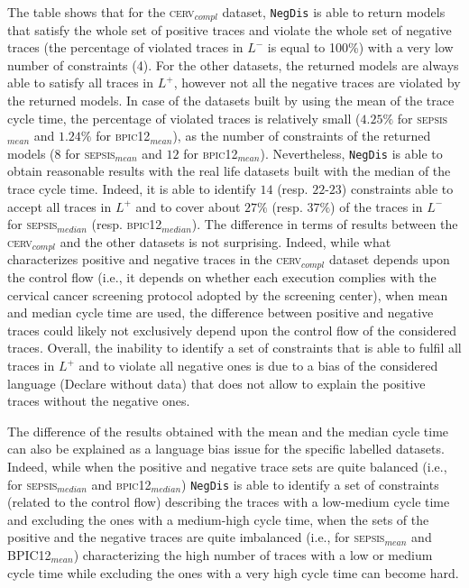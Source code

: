 \documentclass[a4wide,11pt]{article}
\theoremstyle{definition}
\theoremstyle{plain}
\newcommand{\nd}{\texttt{NegDis}\xspace}
\begin{document}
The table shows that for the \textsc{cerv$_{compl}$} dataset, \nd is able to return models that satisfy the whole set of positive traces and violate the whole set of negative traces (the percentage of violated traces in $L^-$ is equal to 100\%) with a very low number of constraints (4). For the other datasets, the returned models are always able to satisfy all traces in $L^+$, however not all the negative traces are violated by the returned models. In case of the datasets built by using the mean of the trace cycle time, the percentage of violated traces is relatively small ($4.25\%$ for \textsc{sepsis$_{mean}$} and $1.24\%$ for \textsc{bpic12$_{mean}$}), as the number of constraints of the returned models ($8$ for \textsc{sepsis$_{mean}$} and $12$ for \textsc{bpic12$_{mean}$}). Nevertheless, \nd is able to obtain reasonable results with the real life datasets built with the median of the trace cycle time. Indeed, it is able to identify $14$ (resp. $22$-$23$) constraints able to accept all traces in $L^+$ and to cover about $27\%$ (resp. $37\%$) of the traces in $L^-$ for \textsc{sepsis$_{median}$} (resp. \textsc{bpic12$_{median}$}). The difference in terms of results between the \textsc{cerv$_{compl}$} and the other datasets is not surprising. Indeed, while what characterizes positive and negative traces in the \textsc{cerv$_{compl}$} dataset depends upon the control flow (i.e., it depends on whether each execution complies with the cervical cancer screening protocol adopted by the screening center), when mean and median cycle time are used, the difference between positive and negative traces could likely not exclusively depend upon the control flow of the considered traces. Overall, the inability to identify a set of constraints that is able to fulfil all traces  in $L^+$ and to violate all negative ones is due to a bias of the considered language (Declare without data) that does not allow to explain the positive traces without the negative ones.

The difference of the results obtained with the mean and the median cycle time can also be explained as a language bias issue for the specific labelled datasets. Indeed, while when the positive and negative trace sets are quite balanced (i.e., for \textsc{sepsis$_{median}$} and \textsc{bpic12$_{median}$}) \nd is able to identify a set of constraints (related to the control flow) describing the traces with a low-medium cycle time and excluding the ones with a medium-high cycle time, when the sets of the positive and the negative traces are quite imbalanced (i.e., for \textsc{sepsis$_{mean}$} and \textsc{BPIC12$_{mean}$})
 characterizing the high number of traces with a low or medium cycle time while excluding the ones with a very high cycle time can become hard. 
\end{document}
